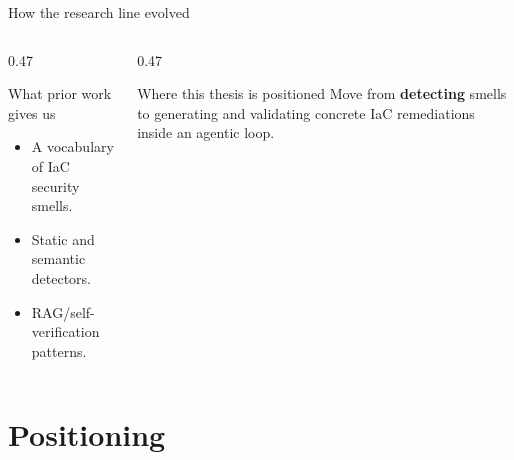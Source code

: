 \documentclass[aspectratio=169, 10pt]{beamer}
\begin{document}
\begin{frame}{How the research line evolved}
  \vspace{1.0em}
  \begin{columns}[T]
    \begin{column}{0.47\textwidth}
      \begin{block}{What prior work gives us}
        \scriptsize
        \begin{itemize}
          \item A vocabulary of IaC security smells.
          \item Static and semantic detectors.
          \item RAG/self-verification patterns.
        \end{itemize}
      \end{block}
    \end{column}
    \begin{column}{0.47\textwidth}
      \begin{exampleblock}{Where this thesis is positioned}
        \scriptsize
        Move from \textbf{detecting} smells to generating and validating
        concrete IaC remediations inside an agentic loop.
      \end{exampleblock}
    \end{column}
  \end{columns}
\end{frame}

\section{Positioning}
\end{document}
